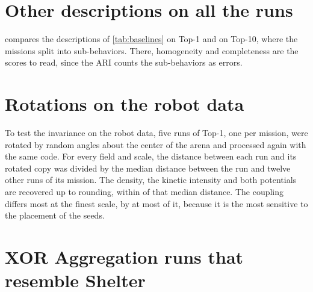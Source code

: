 \section{Other descriptions on all the runs}
\label{app:baselines}

 compares the descriptions of \cref{tab:baselines} on Top-1 and on Top-10, where the missions
split into sub-behaviors. There, homogeneity and completeness are the scores to read, since the ARI counts the
sub-behaviors as errors.

\begin{table}[!htbp]
\centering
\caption{Descriptions of the runs under the same fusion, affinity propagation and modal consensus, on Top-1 and Top-10. The
number of modal settings follows $\Cstar$ in parentheses; \emph{error-free}: settings, out of $99$, in which no run is
misassigned, those in the modal region in parentheses. The method is shaded. $^{*}$Partition published for the same Top-1
runs, with five fixed clusters \citep{legarda2026universal}.}
\label{tab:baselines_full}
{\footnotesize\renewcommand{\arraystretch}{1.0}}
\end{table}
\FloatBarrier

\section{Rotations on the robot data}
\label{app:invariance}

To test the invariance on the robot data, five runs of Top-1, one per mission, were rotated by random angles about the center of the arena
and processed again with the same code. For every field and scale, the distance between each run and
its rotated copy was divided by the median distance between the run and twelve other runs of its mission. The
density, the kinetic intensity and both potentials are recovered up to rounding, within  of that
median distance. The coupling differs most at the finest scale, by at most  of it, because it is the
most sensitive to the placement of the seeds.

\section{XOR Aggregation runs that resemble Shelter}
\label{app:merge}

